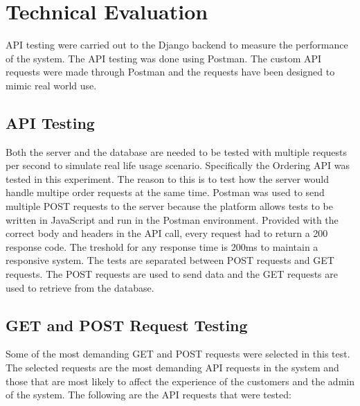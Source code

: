 \section{Technical Evaluation}
API testing were carried out to the Django backend to measure the performance of the system. The API testing was done using Postman. The custom API requests were made through Postman and the requests have been designed to mimic real world use.

\subsection{API Testing}
Both the server and the database are needed to be tested with multiple requests per second to simulate real life usage scenario. Specifically the Ordering API was tested in this experiment. The reason to this is to test how the server would handle multipe order requests at the same time. Postman was used to send multiple POST requests to the server because the platform allows tests to be written in JavaScript and run in the Postman environment. Provided with the correct body and headers in the API call, every request had to return a 200 response code. The treshold for any response time is 200ms to maintain a responsive system. The tests are separated between POST requests and GET requests. The POST requests are used to send data and the GET requests are used to retrieve from the database.

\subsection{GET and POST Request Testing}
Some of the most demanding GET and POST requests were selected in this test. The selected requests are the most demanding API requests in the system and those that are most likely to affect the experience of the customers and the admin of the system. The following are the API requests that were tested:

